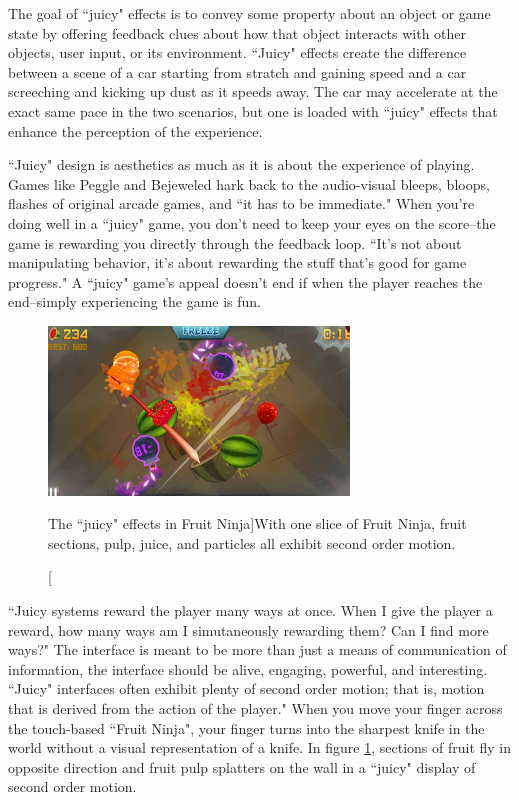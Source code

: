 The goal of ``juicy" effects is to convey some property about an object or game state by offering feedback clues about how that object interacts with other objects, user input, or its environment. ``Juicy" effects create the difference between a scene of a car starting from stratch and gaining speed and a car screeching and kicking up dust as it speeds away. The car may accelerate at the exact same pace in the two scenarios, but one is loaded with ``juicy" effects that enhance the perception of the experience.

``Juicy" design is aesthetics as much as it is about the experience of playing. Games like Peggle and Bejeweled hark back to the audio-visual bleeps, bloops, flashes of original arcade games, and ``it has to be immediate." \cite{popcap2012} When you're doing well in a ``juicy" game, you don't need to keep your eyes on the score--the game is rewarding you directly through the feedback loop. ``It's not about manipulating behavior, it's about rewarding the stuff that's good for game progress." \cite{popcap2012} A ``juicy" game's appeal doesn't end if when the player reaches the end--simply experiencing the game is fun.

\begin{figure}
\begin{center}
\includegraphics[width=80mm]{images/ninja.pdf}
\caption[The ``juicy" effects in Fruit Ninja]{With one slice of Fruit Ninja, fruit sections, pulp, juice, and particles all exhibit second order motion.}
\label{fig:ninja}
\end{center}
\end{figure}

``Juicy systems reward the player many ways at once. When I give the player a reward, how many ways am I simutaneously rewarding them? Can I find more ways?" \cite{schell2008art} The interface is meant to be more than just a means of communication of information, the interface should be alive, engaging, powerful, and interesting. ``Juicy" interfaces often exhibit plenty of second order motion; that is, motion that is derived from the action of the player." \cite{schell2008art} When you move your finger across the touch-based ``Fruit Ninja", your finger turns into the sharpest knife in the world without a visual representation of a knife. In figure \ref{fig:ninja}, sections of fruit fly in opposite direction and fruit pulp splatters on the wall in a ``juicy" display of second order motion. 

